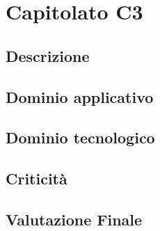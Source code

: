 \section {Capitolato C3}
	\subsection {Descrizione}
	\subsection {Dominio applicativo}
	\subsection {Dominio tecnologico}
	\subsection {Criticità}
	\subsection {Valutazione Finale}